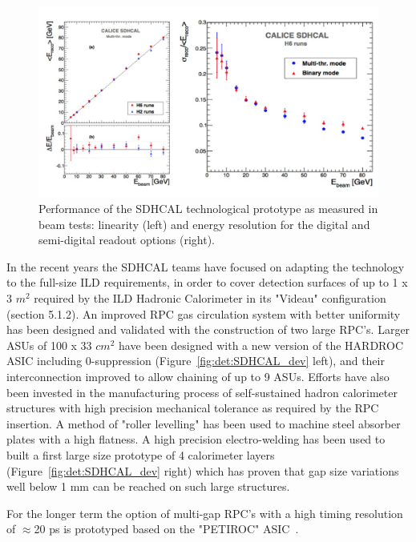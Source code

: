 \begin{figure}[t!]
\centering
\includegraphics[width=1.0\hsize]{Detector/fig/SDHCAL_performance.jpg}
\caption{Performance of the SDHCAL technological prototype as measured in beam tests: linearity (left) and energy resolution for the digital and semi-digital readout options (right).}
\label{fig:det:SDHCAL_perf}
\end{figure}

In the recent years the SDHCAL teams have focused on adapting the technology to the full-size ILD requirements, in order to cover detection surfaces of up to 1 x 3 $m^2$ required by the ILD Hadronic Calorimeter in its "Videau" configuration (section 5.1.2). An improved RPC gas circulation system with better uniformity has been designed and validated with the construction of two large RPC's. Larger ASUs of 100 x 33 $cm^2$ have been designed with a new version of the HARDROC ASIC including 0-suppression (Figure~\ref{fig:det:SDHCAL_dev} left), and their interconnection improved to allow chaining of up to 9 ASUs. Efforts have also been invested in the manufacturing process of self-sustained hadron calorimeter structures with high precision mechanical tolerance as required by the RPC insertion. A method of "roller levelling" has been used to machine steel absorber plates with a high flatness. A high precision electro-welding has been used to built a first large size prototype of 4 calorimeter layers (Figure~\ref{fig:det:SDHCAL_dev} right) which has proven that gap size variations well below 1 mm can be reached on such large structures. 

For the longer term the option of multi-gap RPC's with a high timing resolution of $\approx$20 ps is prototyped based on the "PETIROC" ASIC~\cite{Fleury:2014hfa}. 

